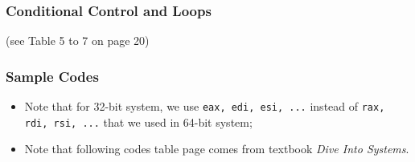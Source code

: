 \documentclass{article}
\begin{document}
\subsubsection{Conditional Control and Loops}
(see Table 5 to 7 on page 20)

\subsubsection*{Sample Codes}
\begin{itemize}
    \item Note that for 32-bit system, we use \texttt{eax, edi, esi, ...} instead of \texttt{rax, rdi, rsi, ...} that we used in 64-bit system;
    \item Note that following codes table page comes from textbook 
\textit{Dive Into Systems}.
\end{itemize}
\end{document}
